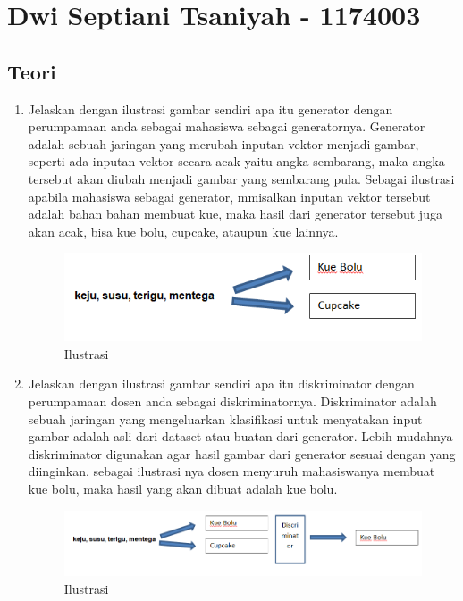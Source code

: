 \section{Dwi Septiani Tsaniyah - 1174003}
\subsection{Teori}

\begin{enumerate}

\item Jelaskan dengan ilustrasi gambar sendiri apa itu generator dengan perumpamaan anda sebagai mahasiswa sebagai generatornya.
Generator adalah sebuah jaringan yang merubah inputan vektor menjadi gambar, seperti ada inputan vektor secara acak yaitu angka sembarang, maka angka tersebut akan diubah menjadi gambar yang sembarang pula. Sebagai ilustrasi apabila mahasiswa sebagai generator, mmisalkan inputan vektor tersebut adalah bahan bahan membuat kue, maka hasil dari generator tersebut juga akan acak, bisa kue bolu, cupcake, ataupun kue lainnya.
\begin{figure}[H]
\centering
\includegraphics[scale=0.4]{figures/1174003/8/1.PNG}
\caption{Ilustrasi}
\label{Contoh}
\end{figure}


\item Jelaskan dengan ilustrasi gambar sendiri apa itu diskriminator dengan perumpamaan dosen anda sebagai diskriminatornya.
Diskriminator adalah sebuah jaringan yang mengeluarkan klasifikasi untuk menyatakan input gambar adalah asli dari dataset atau buatan dari generator. Lebih mudahnya diskriminator digunakan agar hasil gambar dari generator sesuai dengan yang diinginkan. sebagai ilustrasi nya dosen menyuruh mahasiswanya membuat kue bolu, maka hasil yang akan dibuat adalah kue bolu.
\begin{figure}[H]
\centering
\includegraphics[scale=0.4]{figures/1174003/8/2.PNG}
\caption{Ilustrasi}
\label{Contoh}
\end{figure}



\end{enumerate}
